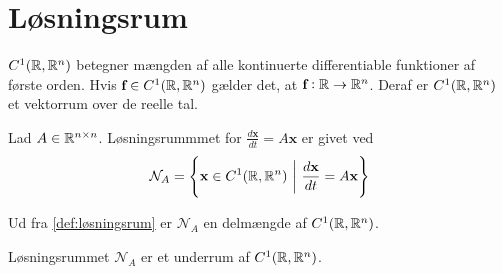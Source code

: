 \section{Løsningsrum}

$C^1(\mathbb{R},\mathbb{R}^n)$ betegner mængden af alle kontinuerte differentiable funktioner af første orden. Hvis $\textbf{f}\in C^1(\mathbb{R},\mathbb{R}^n)$ gælder det, at $\textbf{f}: \mathbb{R} \to \mathbb{R}^n$. Deraf er $C^1(\mathbb{R},\mathbb{R}^n)$ et vektorrum over de reelle tal. 

\begin{defn}\textbf{}\label{def:løsningsrum}
\newline
Lad $A \in \mathbb{R}^{n \times n}$. Løsningsrummmet for $\displaystyle\frac{d\textbf{x}}{dt}=A\textbf{x}$ er givet ved 
%
\begin{align}
    \mathcal{N}_A = \left\{\textbf{x} \in C^1(\R, \R^n)\ \bigg|\  \frac{d\textbf{x}}{dt}=A\textbf{x}\right\}
\end{align}
%
\end{defn}
%
Ud fra \autoref{def:løsningsrum} er $\mathcal{N}_A$ en delmængde af $C^1(\mathbb{R},\mathbb{R}^n)$.  
%
\begin{thmx}\textbf{}
\newline
Løsningsrummet $\mathcal{N}_A$ er et underrum af $C^1(\mathbb{R},\mathbb{R}^n)$.
\end{thmx}
%
